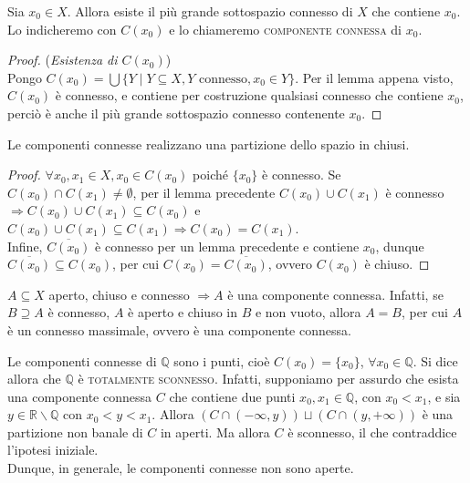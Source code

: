 \begin{defn}
Sia $x_0 \in X$. Allora esiste il più grande sottospazio connesso di $X$ che contiene $x_0$. Lo indicheremo con $C(x_0)$ e lo chiameremo \textsc{componente connessa} di $x_0$.
\end{defn}
\begin{proof}(\emph{Esistenza di $C(x_0)$})\\
Pongo $C(x_0)=\bigcup \{Y \mid Y \subseteq X, Y \text{ connesso},x_0 \in Y\}$. Per il lemma appena visto, $C(x_0)$ è connesso, e contiene per costruzione qualsiasi connesso che contiene $x_0$, perciò è anche il più grande sottospazio connesso contenente $x_0$.
\end{proof}

\begin{prop}
Le componenti connesse realizzano una partizione dello spazio in chiusi. 
\end{prop}
\begin{proof}
$\forall x_0,x_1 \in X, x_0 \in C(x_0)$ poiché $\{x_0\}$ è connesso. Se $C(x_0) \cap C(x_1) \neq \emptyset$, per il lemma precedente $C(x_0) \cup C(x_1)$ è connesso $\Longrightarrow C(x_0) \cup C(x_1) \subseteq C(x_0)$ e $C(x_0) \cup C(x_1) \subseteq C(x_1) \Longrightarrow C(x_0)=C(x_1)$.\\
Infine, $\overline{C(x_0)}$ è connesso per un lemma precedente e contiene $x_0$, dunque $\overline{C(x_0)} \subseteq C(x_0)$, per cui $C(x_0)=\overline{C(x_0)}$, ovvero $C(x_0)$ è chiuso.
\end{proof}

\begin{oss}
$A \subseteq X$ aperto, chiuso e connesso $\Longrightarrow A$ è una componente connessa. Infatti, se $B \supseteq A$ è connesso, $A$ è aperto e chiuso in $B$ e non vuoto, allora $A=B$, per cui $A$ è un connesso massimale, ovvero è una componente connessa.
\end{oss}

\begin{oss}
Le componenti connesse di $\mathbb{Q}$ sono i punti, cioè $C(x_0)=\{x_0\}$, $\forall x_0 \in \mathbb{Q}$. Si dice allora che $\mathbb{Q}$ è \textsc{totalmente sconnesso}. Infatti, supponiamo per assurdo che esista una componente connessa $C$ che contiene due punti $x_0,x_1 \in \mathbb{Q}$, con $x_0<x_1$, e sia $y \in \mathbb{R} \smallsetminus \mathbb{Q}$ con $x_0<y<x_1$. Allora $(C \cap (-\infty,y))\sqcup (C \cap (y,+\infty))$ è una partizione non banale di $C$ in aperti. Ma allora $C$ è sconnesso, il che contraddice l'ipotesi iniziale. \\
Dunque, in generale, le componenti connesse non sono aperte.
\end{oss}

